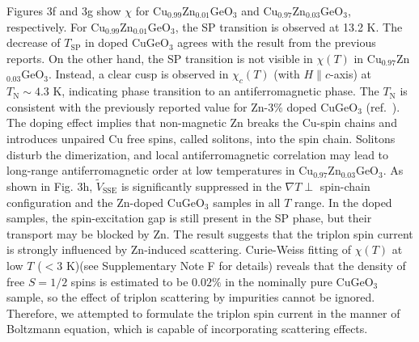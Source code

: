 \documentclass{nature}
\begin{document}
Figures 3f and 3g show $\chi$ for Cu$_{0.99}$Zn$_{0.01}$GeO$_3$ and Cu$_{0.97}$Zn$_{0.03}$GeO$_3$, respectively. 
For Cu$_{0.99}$Zn$_{0.01}$GeO$_3$, the SP transition is observed at 13.2 K. The decrease of $T_{\mathrm{SP}}$ in doped CuGeO$_3$ agrees with the result from the previous reports\cite{Sasago:1996is}. 
On the other hand, the SP transition is not visible in $\chi(T)$ in Cu$_{0.97}$Zn$_{0.03}$GeO$_3$.
Instead, a clear cusp is observed in $\chi_{c}(T)$ (with $H\parallel c$-axis) at $T_{\mathrm{N}}\sim 4.3$ K, indicating phase transition to an antiferromagnetic phase. 
The $T_{\mathrm{N}}$ is consistent with the previously reported value     for Zn-$3\%$ doped CuGeO$_3$ (ref.~\cite{Sasago:1996is}).
The doping effect implies that non-magnetic Zn breaks the Cu-spin chains and introduces unpaired Cu free spins, called solitons, into the spin chain.
Solitons disturb the dimerization, and local antiferromagnetic correlation may lead to long-range antiferromagnetic order\cite{Fukuyama:1996hb} at low temperatures in Cu$_{0.97}$Zn$_{0.03}$GeO$_3$. 
As shown in Fig. 3h, $\tilde{V}_{\mathrm{SSE}}$ is significantly suppressed in the $\nabla T \perp$ spin-chain configuration and the Zn-doped CuGeO$_3$ samples in all $T$ range. 
In the doped samples, the spin-excitation gap is still present in the SP phase, but their transport may be blocked by Zn. 
The result suggests that the triplon spin current is strongly influenced by Zn-induced scattering. 
Curie-Weiss fitting of $\chi(T)$ at low $T$ ($< 3$ K)\cite{Hase:1993bo,Grenier:1998ga}(see Supplementary Note F for details) reveals that the density of free $S=1/2$ spins is estimated to be $0.02\%$ in the nominally pure CuGeO$_3$ sample, so the effect of triplon scattering by impurities cannot be ignored.
Therefore, we attempted to formulate the triplon spin current in the manner of Boltzmann equation, which is capable of incorporating scattering effects.


\par 
\end{document}
